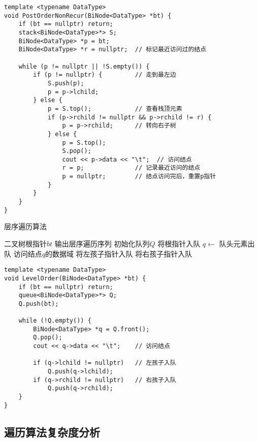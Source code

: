 \documentclass[12pt,a4paper]{amsart}
\begin{document}
\begin{lstlisting}[caption=后序遍历非递归实现]
template <typename DataType>
void PostOrderNonRecur(BiNode<DataType> *bt) {
    if (bt == nullptr) return;
    stack<BiNode<DataType>*> S;
    BiNode<DataType> *p = bt;
    BiNode<DataType> *r = nullptr;  // 标记最近访问过的结点
    
    while (p != nullptr || !S.empty()) {
        if (p != nullptr) {         // 走到最左边
            S.push(p);
            p = p->lchild;
        } else {
            p = S.top();            // 查看栈顶元素
            if (p->rchild != nullptr && p->rchild != r) {
                p = p->rchild;      // 转向右子树
            } else {
                p = S.top();
                S.pop();
                cout << p->data << "\t";  // 访问结点
                r = p;              // 记录最近访问的结点
                p = nullptr;        // 结点访问完后，重置p指针
            }
        }
    }
}
\end{lstlisting}

\begin{algorithm}[H]
\caption{层序遍历算法}
\begin{algorithmic}[1]
\REQUIRE 二叉树根指针$bt$
\ENSURE 输出层序遍历序列
\STATE 初始化队列$Q$
    \STATE 将根指针入队
        \STATE $q \leftarrow$ 队头元素出队
        \STATE 访问结点$q$的数据域
            \STATE 将左孩子指针入队
        \ENDIF
            \STATE 将右孩子指针入队
        \ENDIF
    \ENDWHILE
\ENDIF
\end{algorithmic}
\end{algorithm}

\begin{lstlisting}[caption=层序遍历实现]
template <typename DataType>
void LevelOrder(BiNode<DataType> *bt) {
    if (bt == nullptr) return;
    queue<BiNode<DataType>*> Q;
    Q.push(bt);
    
    while (!Q.empty()) {
        BiNode<DataType> *q = Q.front();
        Q.pop();
        cout << q->data << "\t";    // 访问结点
        
        if (q->lchild != nullptr)   // 左孩子入队
            Q.push(q->lchild);
        if (q->rchild != nullptr)   // 右孩子入队
            Q.push(q->rchild);
    }
}
\end{lstlisting}

\subsection{遍历算法复杂度分析}
\end{document}
